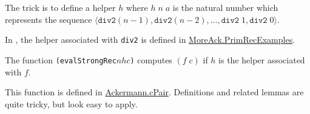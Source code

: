   The trick is to define a helper $h$ where
  $h\;n\;a$ is the natural number which represents
  the sequence $\langle \texttt{div2}(n-1),
  \texttt{div2}(n-2),\dots,\texttt{div2}\;1, \texttt{div2}\;0\rangle$.

  In \coq, the helper associated with \texttt{div2} is defined in
  \href{../theories/html/hydras.MoreAck/PrimRecExamples}{MoreAck.PrimRecExamples}.
  

  
  
  The function \texttt{(evalStrongRec\;$n$\;$h$\;$c$)} computes
  $(f\;c)$ if $h$ is the helper associated with $f$.


  
  This function is defined in
  \href{../theories/html/hydras.Ackermann.cPair.html}{Ackermann.cPair}.
   Definitions and related lemmas are quite tricky, but look easy to apply. 


  
  
 



  

       